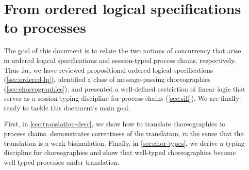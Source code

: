 % 











% 

\section{From ordered logical specifications to processes}\label{sec:translation}

The goal of this document is to relate the two notions of concurrency that arise in ordered logical specifications and session-typed process chains, respectively.
Thus far, we have reviewed propositional ordered logical specifications (\cref{sec:ordered-lp}), identified a class of message-passing choreographies (\cref{sec:choreographies}), and presented a well-defined restriction of linear logic that serves as a session-typing discipline for process chains (\cref{sec:sill}).
We are finally ready to tackle this document's main goal.

First, in \cref{sec:translation-desc}, we show how to translate choreographies to process chains.
 demonstrates correctness of the translation, in the sense that the translation is a weak bisimulation.
Finally, in \cref{sec:chor-types}, we derive a typing discipline for choreographies and show that well-typed choreographies become well-typed processes under translation.

